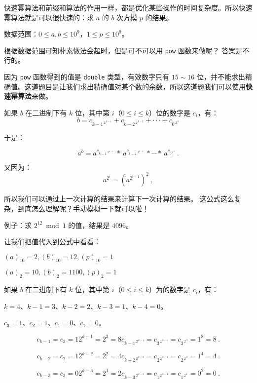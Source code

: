 
快速幂算法和前缀和算法的作用一样，都是优化某些操作的时间复杂度。所以快速幂算法就是可以很快速的：求 $a$ 的 $b$ 次方模 $p$ 的结果。

数据范围：$0 \le a,b \le 10^9$，$1 \le p \le 10^9$。

根据数据范围可知朴素做法会超时，但是可不可以用 \verb|pow| 函数来做呢？
答案是不行的。

因为 \verb|pow| 函数得到的值是 \verb|double| 类型，有效数字只有 $15\sim16$ 位，并不能求出精确值。这道题目是让我们求出精确值对某个数的余数，所以这道题我们可以使用\textbf{快速幂算法}来做。

如果 $b$ 在二进制下有 $k$ 位，其中第 $i$（$0 \le i \le k$）位的数字是 $c_i$，有：
\begin{equation}
b = c_{{k-1}^{\ 2^{\ k-1}}}+c_{{k-2}^{\ 2^{\ k-2}}}+\cdot\cdot\cdot+c_{{0}^{\ 2^{\ 0}}}
\end{equation}

于是：

\begin{equation}
a^b= a^{c_{{k-1}^{\ \ 2^{\ k-1}}}} \ *\  a^{c_{{k-2}^{\ \ 2^{\ k-2}}}} \ * \cdots * \ a^{c_{{0}^{\ 2^{\ 0}}}}~.
\end{equation}

又因为：
$$
a^{2^{i}} = (a^{2^{i-1}})^2~,
$$

所以我们可以通过上一次计算的结果来计算下一次计算的结果。
这公式这么复杂，到底怎么理解呢？手动模拟一下就可以啦！

例子：求 $2^{12} \bmod 1$ 的值，结果是 $4096$。

让我们把值代入到公式中看看：

$ (a) _ {10} =  2, (b) _ {10} = 12, (p) _ {10} = 1$

$ (a) _ 2 = 10, (b) _ 2 = 1100, (p) _ 2 = 1 $

如果 $b$ 在二进制下有 $k$ 位，其中第 $i$（$0 \le i \le k$）为的数字是 $c_i$，有：

$k = 4$、$k - 1 = 3$、$k - 2 = 2$、$k - 3 = 1$、$k - 4 = 0$。

$c_3 = 1$、$c_2 = 1$、$c_1 = 0$、$c_1 = 0$。

$$
c_{k - 1} = c_3 = 1
2 ^ {k - 1} = 2 ^ 3 = 8
c_{{k-1}^{\ 2^{\ k-1}}} = c_{{3}^{\ 2^{\ k-1}}} = c_{{3}^{\ 2^{\ 3}}} = 1^8 = 8~.
$$

$$
c_{k - 2} = c_2 = 1
2 ^ {k - 2} = 2 ^ 2 = 4
c_{{k-2}^{\ 2^{\ k-2}}} = c_{{2}^{\ 2^{\ k-2}}} = c_{{2}^{\ 2^{\ 2}}} = 1^4 = 4~.
$$

$$
c_{k - 3} = c_3 = 0
2 ^ {k - 3} = 2 ^ 1 = 2
c_{{k-3}^{\ 2^{\ k-3}}} = c_{{1}^{\ 2^{\ k-3}}} = c_{{1}^{\ 2^{\ 1}}} = 0^2 = 0~.
$$

